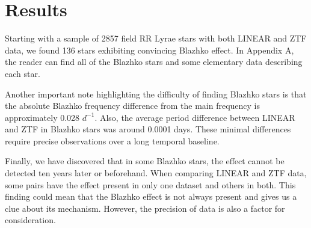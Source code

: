 

\section{Results}\label{sec:results}

Starting with a sample of 2857 field RR Lyrae stars with both LINEAR and ZTF data, we found 136 stars exhibiting
convincing Blazhko effect. In Appendix A, the reader can find all of the Blazhko stars and some elementary data
describing each star. 


Another important note highlighting the difficulty of finding Blazhko
stars is that the absolute Blazhko frequency difference from the main
frequency is approximately 0.028 $d^{-1}$. Also, the average period
difference between LINEAR and ZTF in Blazhko stars was around 0.0001
days. These minimal differences require precise observations over a
long temporal baseline.  


Finally, we have discovered that in some Blazhko stars, the effect cannot be detected ten years later or beforehand.
When comparing LINEAR and ZTF data, some pairs have the effect present in only one dataset and others in both.
This finding could mean that the Blazhko effect is not always present and gives us a clue about its mechanism.
However, the precision of data is also a factor for consideration. 


